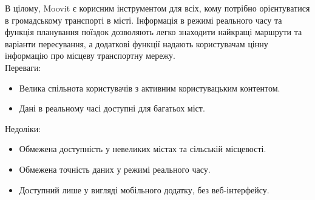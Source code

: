 В цілому, Moovit є корисним інструментом для всіх, кому потрібно 
орієнтуватися в громадському транспорті в місті. Інформація в режимі 
реального часу та функція планування поїздок дозволяють легко 
знаходити найкращі маршрути та варіанти пересування, а додаткові 
функції надають користувачам цінну інформацію про місцеву транспортну 
мережу.\\


Переваги:
\begin{itemize}
    \item Велика спільнота користувачів з активним користувацьким 
    контентом.
    \item Дані в реальному часі доступні для багатьох міст.
\end{itemize}

Недоліки:
\begin{itemize}
    \item Обмежена доступність у невеликих містах та сільській 
    місцевості.
    \item Обмежена точність даних у режимі реального часу.
    \item Доступний лише у вигляді мобільного додатку, без 
    веб-інтерфейсу.
\end{itemize}
